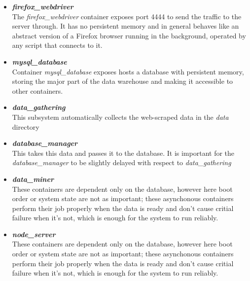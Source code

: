 \begin{itemize}
    \item{\textbf{\textit{firefox\_webdriver}}} \\
    The \textit{firefox\_webdriver} container exposes port 4444 to send the traffic to the server through. It has no persistent memory and in general behaves like an abstract version of a Firefox browser running in the background, operated by any script that connects to it.

    \item{\textbf{\textit{mysql\_database}}} \\
    Container \textit{mysql\_database} exposes hosts a database with persistent memory, storing the major part of the data warehouse and making it accessible to other containers.

    \item{\textbf{\textit{data\_gathering}}} \\
    This subsystem automatically collects the web-scraped data in the \textit{data} directory

    \item{\textbf{\textit{database\_manager}}} \\
    This takes this data and passes it to the database. It is important for the \textit{database\_manager} to be slightly delayed with respect to \textit{data\_gathering}

    \item{\textbf{\textit{data\_miner}}} \\
    These containers are dependent only on the database, however here boot order or system state are not as important; these asynchonous containers perform their job properly when the data is ready and don't cause critial failure when it's not, which is enough for the system to run reliably.

    \item{\textbf{\textit{node\_server}}} \\
    These containers are dependent only on the database, however here boot order or system state are not as important; these asynchonous containers perform their job properly when the data is ready and don't cause critial failure when it's not, which is enough for the system to run reliably.
\end{itemize}

